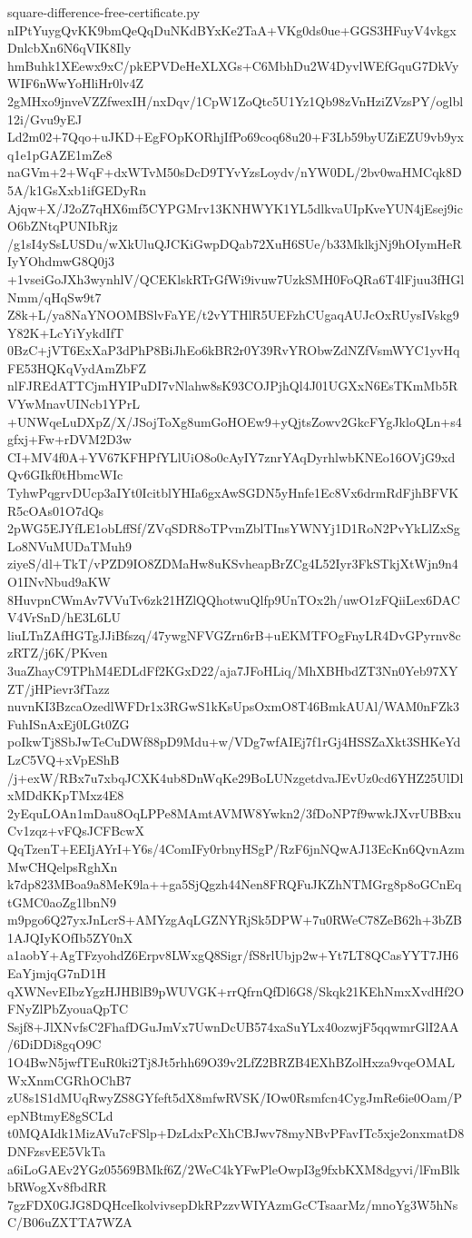 \documentclass[11pt]{article}
\theoremstyle{definition}
\theoremstyle{remark}
\begin{document}
\begin{filecontents*}[overwrite]{square-difference-free-certificate.py}
nIPtYuygQvKK9bmQeQqDuNKdBYxKe2TaA+VKg0ds0ue+GGS3HFuyV4vkgxDnlcbXn6N6qVIK8Ily
hmBuhk1XEewx9xC/pkEPVDeHeXLXGs+C6MbhDu2W4DyvlWEfGquG7DkVyWIF6nWwYoHliHr0lv4Z
2gMHxo9jnveVZZfwexIH/nxDqv/1CpW1ZoQtc5U1Yz1Qb98zVnHziZVzsPY/oglbl12i/Gvu9yEJ
Ld2m02+7Qqo+uJKD+EgFOpKORhjIfPo69coq68u20+F3Lb59byUZiEZU9vb9yxq1e1pGAZE1mZe8
naGVm+2+WqF+dxWTvM50sDcD9TYvYzsLoydv/nYW0DL/2bv0waHMCqk8D5A/k1GsXxb1ifGEDyRn
Ajqw+X/J2oZ7qHX6mf5CYPGMrv13KNHWYK1YL5dlkvaUIpKveYUN4jEsej9icO6bZNtqPUNIbRjz
/g1sI4ySsLUSDu/wXkUluQJCKiGwpDQab72XuH6SUe/b33MklkjNj9hOIymHeRIyYOhdmwG8Q0j3
+1vseiGoJXh3wynhlV/QCEKlskRTrGfWi9ivuw7UzkSMH0FoQRa6T4lFjuu3fHGlNmm/qHqSw9t7
Z8k+L/ya8NaYNOOMBSlvFaYE/t2vYTHlR5UEFzhCUgaqAUJcOxRUysIVskg9Y82K+LcYiYykdIfT
0BzC+jVT6ExXaP3dPhP8BiJhEo6kBR2r0Y39RvYRObwZdNZfVsmWYC1yvHqFE53HQKqVydAmZbFZ
nlFJREdATTCjmHYIPuDI7vNlahw8sK93COJPjhQl4J01UGXxN6EsTKmMb5RVYwMnavUINcb1YPrL
+UNWqeLuDXpZ/X/JSojToXg8umGoHOEw9+yQjtsZowv2GkcFYgJkloQLn+s4gfxj+Fw+rDVM2D3w
CI+MV4f0A+YV67KFHPfYLlUiO8o0cAyIY7znrYAqDyrhlwbKNEo16OVjG9xdQv6GIkf0tHbmcWIc
TyhwPqgrvDUcp3aIYt0IcitblYHIa6gxAwSGDN5yHnfe1Ec8Vx6drmRdFjhBFVKR5cOAs01O7dQs
2pWG5EJYfLE1obLffSf/ZVqSDR8oTPvmZblTInsYWNYj1D1RoN2PvYkLlZxSgLo8NVuMUDaTMuh9
ziyeS/dl+TkT/vPZD9IO8ZDMaHw8uKSvheapBrZCg4L52Iyr3FkSTkjXtWjn9n4O1INvNbud9aKW
8HuvpnCWmAv7VVuTv6zk21HZlQQhotwuQlfp9UnTOx2h/uwO1zFQiiLex6DACV4VrSnD/hE3L6LU
liuLTnZAfHGTgJJiBfszq/47ywgNFVGZrn6rB+uEKMTFOgFnyLR4DvGPyrnv8czRTZ/j6K/PKven
3uaZhayC9TPhM4EDLdFf2KGxD22/aja7JFoHLiq/MhXBHbdZT3Nn0Yeb97XYZT/jHPievr3fTazz
nuvnKI3BzcaOzedlWFDr1x3RGwS1kKsUpsOxmO8T46BmkAUAl/WAM0nFZk3FuhISnAxEj0LGt0ZG
poIkwTj8SbJwTeCuDWf88pD9Mdu+w/VDg7wfAIEj7f1rGj4HSSZaXkt3SHKeYdLzC5VQ+xVpEShB
/j+exW/RBx7u7xbqJCXK4ub8DnWqKe29BoLUNzgetdvaJEvUz0cd6YHZ25UlDlxMDdKKpTMxz4E8
2yEquLOAn1mDau8OqLPPe8MAmtAVMW8Ywkn2/3fDoNP7f9wwkJXvrUBBxuCv1zqz+vFQsJCFBcwX
QqTzenT+EEIjAYrI+Y6s/4ComIFy0rbnyHSgP/RzF6jnNQwAJ13EcKn6QvnAzmMwCHQelpsRghXn
k7dp823MBoa9a8MeK9la++ga5SjQgzh44Nen8FRQFuJKZhNTMGrg8p8oGCnEqtGMC0aoZg1lbnN9
m9pgo6Q27yxJnLcrS+AMYzgAqLGZNYRjSk5DPW+7u0RWeC78ZeB62h+3bZB1AJQIyKOfIb5ZY0nX
a1aobY+AgTFzyohdZ6Erpv8LWxgQ8Sigr/fS8rlUbjp2w+Yt7LT8QCasYYT7JH6EaYjmjqG7nD1H
qXWNevEIbzYgzHJHBlB9pWUVGK+rrQfrnQfDl6G8/Skqk21KEhNmxXvdHf2OFNyZlPbZyouaQpTC
Ssjf8+JlXNvfsC2FhafDGuJmVx7UwnDcUB574xaSuYLx40ozwjF5qqwmrGlI2AA/6DiDDi8gqO9C
1O4BwN5jwfTEuR0ki2Tj8Jt5rhh69O39v2LfZ2BRZB4EXhBZolHxza9vqeOMALWxXnmCGRhOChB7
zU8s1S1dMUqRwyZS8GYfeft5dX8mfwRVSK/IOw0Rsmfcn4CygJmRe6ie0Oam/PepNBtmyE8gSCLd
t0MQAIdk1MizAVu7cFSlp+DzLdxPcXhCBJwv78myNBvPFavITc5xje2onxmatD8DNFzsvEE5VkTa
a6iLoGAEv2YGz05569BMkf6Z/2WeC4kYFwPleOwpI3g9fxbKXM8dgyvi/lFmBlkbRWogXv8fbdRR
7gzFDX0GJG8DQHceIkolvivsepDkRPzzvWIYAzmGcCTsaarMz/mnoYg3W5hNsC/B06uZXTTA7WZA

\end{filecontents*}
\end{document}
